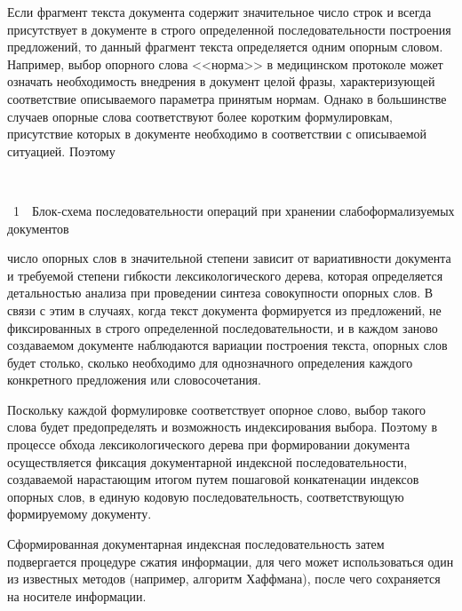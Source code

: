 \begin{multicols}{2}
     Если фрагмент текста документа содержит значительное число строк и 
всегда присутствует в документе в строго определенной последовательности 
построения предложений, то данный фрагмент текста определяется одним 
опорным словом. Например, выбор опорного слова <<норма>> в медицинском 
протоколе может означать необходимость внедрения в документ целой фразы, 
характеризующей соответствие описываемого параметра принятым нормам. 
Однако в большинстве случаев опорные слова соответствуют более коротким 
формулировкам, присутствие которых в документе необходимо в соответствии 
с описываемой ситуацией. Поэтому\linebreak\vspace*{-12pt}
\pagebreak


\begin{center} %
\vspace*{2pt}
\mbox{%
\epsfxsize=76.518mm
}
\end{center}
\vspace*{4pt}
{{\figurename~1}\ \ \small{Блок-схема последовательности операций при хранении 
слабоформализуемых документов}}


\bigskip
\addtocounter{figure}{1}


\noindent 
число опорных слов в значительной 
степени зависит от вариативности документа и требуемой степени гибкости 
лексикологического дерева, которая определяется детальностью анализа при 
проведении синтеза совокупности опорных слов. В связи с этим в случаях, 
когда текст документа формируется из предложений, не фиксированных в 
строго определенной последовательности, и в каждом заново создаваемом 
документе наблюдаются вариации построения текста, опорных слов будет 
столько, сколько необходимо для однозначного определения каждого 
конкретного предложения или словосочетания.
     
     Поскольку каждой формулировке соответствует опорное слово, выбор 
такого слова будет пред\-опре\-де\-лять и возможность индексирования выбора. 
Поэтому в процессе обхода лексикологического дерева при формировании 
документа осуществляется фиксация документарной индексной 
последовательности, создаваемой нарастающим итогом путем пошаговой 
конкатенации индексов опорных слов, в единую кодовую последовательность, 
соответствующую формируемому документу.
     
     Сформированная документарная индексная последовательность затем 
подвергается процедуре сжатия информации, для чего может использоваться 
один из известных методов (например, алгоритм Хаффмана), после чего 
сохраняется на носителе информации.
     

\end{multicols}
